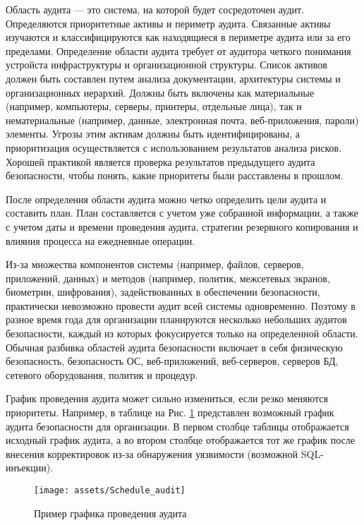 Область аудита — это система, на которой будет сосредоточен аудит. Определяются приоритетные активы и периметр аудита. Связанные активы изучаются и классифицируются как находящиеся в периметре аудита или за его пределами. Определение области аудита требует от аудитора четкого понимания устройста инфраструктуры и организационной структуры. Список активов должен быть составлен путем анализа документации, архитектуры системы и организационных иерархий. Должны быть включены как материальные (например, компьютеры, серверы, принтеры, отдельные лица), так и нематериальные (например, данные, электронная почта, веб-приложения, пароли) элементы. Угрозы этим активам должны быть идентифицированы, а приоритизация осуществляется с использованием результатов анализа рисков. Хорошей практикой является проверка результатов предыдущего аудита безопасности, чтобы понять, какие приоритеты были расставлены в прошлом.

После определения области аудита можно четко определить цели аудита и составить план. План составляется с учетом уже собранной информации, а также с учетом даты и времени проведения аудита, стратегии резервного копирования и влияния процесса на ежедневные операции.

Из-за множества компонентов системы (например, файлов, серверов, приложений, данных) и методов (например, политик, межсетевых экранов, биометрии, шифрования), задействованных в обеспечении безопасности, практически невозможно провести аудит всей системы одновременно. Поэтому в разное время года для организации планируются несколько небольших аудитов безопасности, каждый из которых фокусируется только на определенной области. Обычная разбивка областей аудита безопасности включает в себя физическую безопасность, безопасность ОС, веб-приложений, веб-серверов, серверов БД, сетевого оборудования, политик и процедур.

График проведения аудита может сильно измениться, если резко меняются приоритеты. Например, в таблице на Рис. \ref{fig:Schedule_audit} представлен возможный график аудита безопасности для организации. В первом столбце таблицы отображается исходный график аудита, а во втором столбце отображается тот же график после внесения корректировок из-за обнаружения уязвимости (возможной SQL-инъекции).

\begin{figure}[h!]
    \centering
    \texttt{[image: assets/Schedule\_audit]}
    \caption{Пример графика проведения аудита}
	\label{fig:Schedule_audit}
\end{figure}


